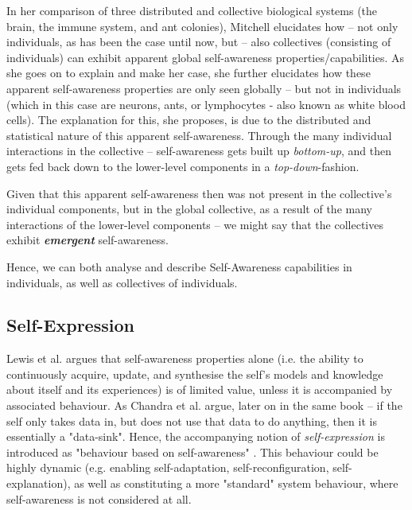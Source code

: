 	In her comparison of three distributed and collective biological systems (the brain, the immune system, and ant colonies), Mitchell \cite{mitchell} elucidates how -- not only individuals, as has been the case until now, but -- also collectives (consisting of individuals) can exhibit apparent global self-awareness properties/capabilities. As she goes on to explain and make her case, she further elucidates how these apparent self-awareness properties are only seen globally -- but not in individuals (which in this case are neurons, ants, or lymphocytes - also known as white blood cells). The explanation for this, she proposes, is due to the distributed and statistical nature of this apparent self-awareness. Through the many individual interactions in the collective -- self-awareness gets built up \textit{bottom-up}, and then gets fed back down to the lower-level components in a \textit{top-down}-fashion.

	Given that this apparent self-awareness then was not present in the collective's individual components, but in the global collective, as a result of the many interactions of the lower-level components -- we might say that the collectives exhibit \textbf{\textit{emergent}} self-awareness.

	Hence, we can both analyse and describe Self-Awareness capabilities in individuals, as well as collectives of individuals.


	\subsection{Self-Expression}
	Lewis et al. \cite{sacs16_ch2} argues that self-awareness properties alone (i.e. the ability to continuously acquire, update, and synthesise the self's models and knowledge about itself and its experiences) is of limited value, unless it is accompanied by associated behaviour. As Chandra et al. \cite{sacs16_ch4} argue, later on in the same book -- if the self only takes data in, but does not use that data to do anything, then it is essentially a "data-sink". Hence, the accompanying notion of \textit{self-expression} is introduced as "behaviour based on self-awareness" \cite{sacs16_ch2}. This behaviour could be highly dynamic (e.g. enabling self-adaptation, self-reconfiguration, self-explanation), as well as constituting a more "standard" system behaviour, where self-awareness is not considered at all.




